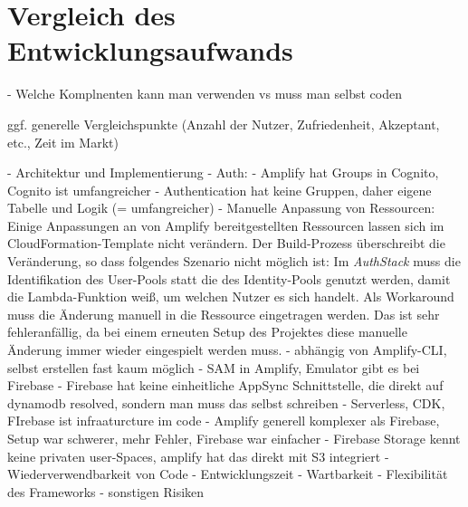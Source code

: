 \chapter{Vergleich des Entwicklungsaufwands}

- Welche Komplnenten kann man verwenden vs muss man selbst coden

ggf. generelle Vergleichspunkte (Anzahl der Nutzer, Zufriedenheit, Akzeptant, etc., Zeit im Markt)

- Architektur und Implementierung
  - Auth:
    - Amplify hat Groups in Cognito, Cognito ist umfangreicher
    - Authentication hat keine Gruppen, daher eigene Tabelle und Logik (= umfangreicher)
  - Manuelle Anpassung von Ressourcen: Einige Anpassungen an von Amplify bereitgestellten Ressourcen lassen sich im CloudFormation-Template nicht verändern. Der Build-Prozess überschreibt die Veränderung, so dass folgendes Szenario nicht möglich ist: Im \textit{AuthStack} muss die Identifikation des User-Pools statt die des Identity-Pools genutzt werden, damit die Lambda-Funktion weiß, um welchen Nutzer es sich handelt. Als Workaround muss die Änderung manuell in die Ressource eingetragen werden. Das ist sehr fehleranfällig, da bei einem erneuten Setup des Projektes diese manuelle Änderung immer wieder eingespielt werden muss.
    - abhängig von Amplify-CLI, selbst erstellen fast kaum möglich
 - SAM in Amplify, Emulator gibt es bei Firebase
 - Firebase hat keine einheitliche AppSync Schnittstelle, die direkt auf dynamodb resolved, sondern man muss das selbst schreiben
 - Serverless, CDK, FIrebase ist infraaturcture im code
 - Amplify generell komplexer als Firebase, Setup war schwerer, mehr Fehler, Firebase war einfacher
 - Firebase Storage kennt keine privaten user-Spaces, amplify hat das direkt mit S3 integriert
- Wiederverwendbarkeit von Code
- Entwicklungszeit
- Wartbarkeit
- Flexibilität des Frameworks
- sonstigen Risiken